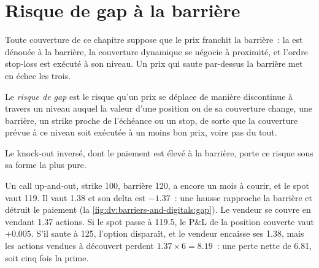 \section{Risque de gap à la barrière}

Toute couverture de ce chapitre suppose que le prix franchit la barrière~: la  est dénouée à la barrière,
la couverture dynamique se négocie à proximité, et l'ordre stop-loss est exécuté à son niveau. Un prix qui saute par-dessus la
barrière met en échec les trois.

\begin{definition}\label{def:dv:barriers-and-digitals:gap}
Le \emph{risque de gap} est le risque qu'un prix se déplace de manière discontinue à travers un niveau auquel la valeur d'une position
ou de sa couverture change, une barrière, un strike proche de l'échéance ou un stop, de sorte que la couverture prévue à ce niveau soit exécutée à un
moins bon prix, voire pas du tout.
\end{definition}

Le knock-out inversé, dont le paiement est élevé à la barrière, porte ce risque sous sa forme la plus pure.

\begin{example}\label{ex:dv:barriers-and-digitals:gap}
Un call up-and-out, strike 100, barrière 120, a encore un mois à courir, et le spot vaut 119. Il vaut 1.38 et son delta est
$-1.37$~: une hausse rapproche la barrière et détruit le paiement
(la \cref{fig:dv:barriers-and-digitals:gap}). Le vendeur se couvre en vendant 1.37 actions. Si le spot passe à 119.5, le
P\&L de la position couverte vaut $+0.005$. S'il saute à 125, l'option disparaît, et le vendeur encaisse ses 1.38, mais les
actions vendues à découvert perdent $1.37\times6=8.19$~: une perte nette de 6.81, soit cinq fois la prime.
\end{example}


